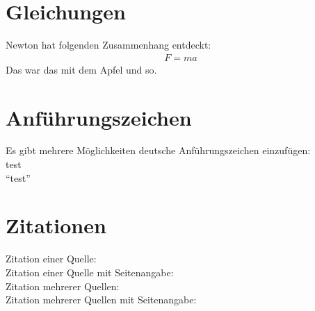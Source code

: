 
\cleardoublepage


\section*{Gleichungen}
\label{sec:gleichungen}

Newton hat folgenden Zusammenhang entdeckt:
\begin{align}
    F = m a
    \label{eqn:newton}
\end{align}
Das war das mit dem Apfel und so.

\section*{Anführungszeichen}
\label{sec:anfuehrungszeichen}
Es gibt mehrere Möglichkeiten deutsche Anführungszeichen einzufügen:\\
\glqq test\grqq\\
"`test"'\\


\section*{Zitationen}

Zitation einer Quelle: \cite{Mustermann.2012}\\
Zitation einer Quelle mit Seitenangabe: \cite[12-16]{Mustermann.2012}\\
Zitation mehrerer Quellen: \cites{Mustermann.2012}{Musterfrau.2011}\\
Zitation mehrerer Quellen mit Seitenangabe: \cites[12-16]{Mustermann.2012}[3]{Musterfrau.2011}\\

